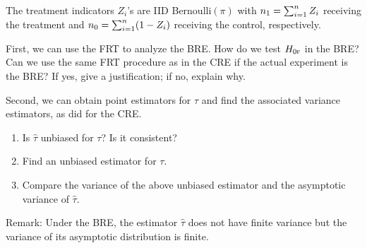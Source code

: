 \begin{definition}
[BRE]\label{def::BRE}
The treatment indicators $Z_i$'s are IID Bernoulli$(\pi)$ with $n_1 = \sum_{i=1}^n Z_i$ receiving the treatment and $n_0 = \sum_{i=1}^n (1-Z_i)$ receiving the control, respectively.
\end{definition}



First, we can use the FRT to analyze the BRE. How do we test $H_{0\textsc{f}}$ in the BRE? Can we use the same FRT procedure as in the CRE if the actual experiment is the BRE? If yes, give a justification; if no, explain why.

Second, we can obtain point estimators for $\tau$ and find the associated variance estimators, as \citet{Neyman:1923} did for the CRE.
\begin{enumerate}
\item
Is $\hat{\tau}$ unbiased for $\tau$? Is it consistent?
\item
Find an unbiased estimator for $\tau$.
\item
Compare the variance of the above unbiased estimator and the asymptotic variance of $\hat{\tau}$.
\end{enumerate}

Remark:
Under the BRE, the estimator $\hat{\tau}$ does not have finite variance but the variance of its asymptotic distribution is finite.


